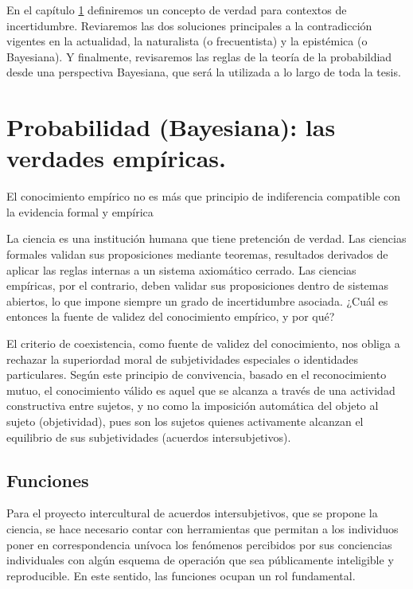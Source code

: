 \documentclass[a4paper,10pt]{book}
\theoremstyle{definition}
\begin{document}
\begin{framed}
En el capítulo \ref{ch:proba} definiremos un concepto de verdad para contextos de incertidumbre.
Reviaremos las dos soluciones principales a la contradicción vigentes en la actualidad, la naturalista (o frecuentista) y la epistémica (o Bayesiana).
Y finalmente, revisaremos las reglas de la teoría de la probabildiad desde una perspectiva Bayesiana, que será la utilizada a lo largo de toda la tesis.
\end{framed}


\chapter{Probabilidad (Bayesiana): las verdades empíricas.} \label{ch:proba}

\epigraph{El conocimiento empírico no es más que principio de indiferencia compatible con la evidencia formal y empírica}{}

La ciencia es una institución humana que tiene pretención de verdad.
Las ciencias formales validan sus proposiciones mediante teoremas, resultados derivados de aplicar las reglas internas a un sistema axiomático cerrado.
Las ciencias empíricas, por el contrario, deben validar sus proposiciones dentro de sistemas abiertos, lo que impone siempre un grado de incertidumbre asociada.
¿Cuál es entonces la fuente de validez del conocimiento empírico, y por qué?

El criterio de coexistencia, como fuente de validez del conocimiento, nos obliga a rechazar la superiordad moral de subjetividades especiales o identidades particulares.
Según este principio de convivencia, basado en el reconocimiento mutuo, el conocimiento válido es aquel que se alcanza a través de una actividad constructiva entre sujetos, y no como la imposición automática del objeto al sujeto (objetividad), pues son los sujetos quienes activamente alcanzan el equilibrio de sus subjetividades (acuerdos intersubjetivos).


\section{Funciones}

Para el proyecto intercultural de acuerdos intersubjetivos, que se propone la ciencia, se hace necesario contar con herramientas que permitan a los individuos poner en correspondencia unívoca los fenómenos percibidos por sus conciencias individuales con algún esquema de operación que sea públicamente inteligible y reproducible.
En este sentido, las funciones ocupan un rol fundamental.
\end{document}
